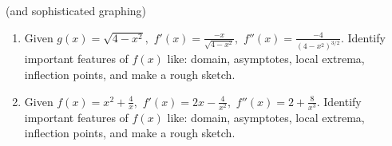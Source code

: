 \documentclass[11pt,fleqn]{article}
\begin{document}
\setlength{\parindent}{0cm}
\renewcommand{\headrulewidth}{0pt}
\newcommand{\blank}[1]{\rule{#1}{0.75pt}}
\renewcommand{\d}{\displaystyle}
\vspace*{-0.7in}
\begin{center}
 {\large{ }}
 (and sophisticated graphing)
\end{center}
 \begin{enumerate}
 \item Given $g(x)=\sqrt{4-x^2},$ $f'(x)=\frac{-x}{\sqrt{4-x^2}},$ $f''(x)= \frac{-4}{(4-x^2)^{3/2}}.$  Identify important features of $f(x)$ like: domain, asymptotes, local extrema, inflection points, and make a rough sketch.
 \newpage
 \item Given $f(x)=x^2+\frac{4}{x},$ $f'(x)=2x-\frac{4}{x^2},$ $f''(x)= 2+\frac{8}{x^3}.$  Identify important features of $f(x)$ like: domain, asymptotes, local extrema, inflection points, and make a rough sketch.
 \vfill
 \end{enumerate}
\end{document}
